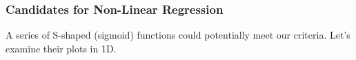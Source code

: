 \documentclass[10pt,aspectratio=169]{beamer}
\begin{document}
\begin{frame}
  \frametitle{Candidates for Non-Linear Regression}

  A series of S-shaped (sigmoid) functions could potentially meet our
  criteria. Let's examine their plots in 1D.  \vfill
  \begin{figure}[t]
  \end{figure}
\end{frame}
\end{document}
